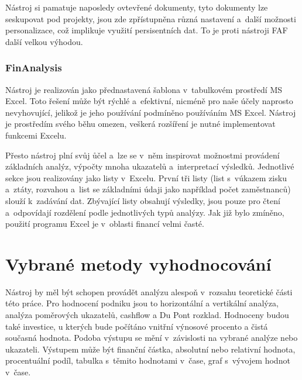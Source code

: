 Nástroj si pamatuje naposledy ovtevřené dokumenty, tyto dokumenty lze seskupovat pod projekty, jsou zde zpřístupněna různá nastavení a~další možnosti personalizace, což implikuje využití persisentních dat. To je proti nástroji FAF další velkou výhodou. 


\subsubsection{FinAnalysis}
Nástroj je realizován jako přednastavená šablona v~tabulkovém prostředí MS Excel. Toto řešení může být rýchlé a~efektivní, nicméně pro naše účely naprosto nevyhovující, jelikož je jeho používání podmíněno používáním MS Excel. Nástroj je prostředím svého běhu omezen, veškerá rozšíření je nutné implementovat funkcemi Excelu.

Přesto nástroj plní svůj ůčel a~lze se v~něm inspirovat možnostmi provádení základních analýz, výpočty mnoha ukazatelů a~interpretací výsledků. Jednotlivé sekce jsou realizovány jako listy v~Excelu. První tři listy (list s~vúkazem zisku a~ztáty, rozvahou a~list se základními údaji jako například počet zaměstnanců) slouží k~zadávání dat. Zbývající listy obsahují výsledky, jsou pouze pro čtení a~odpovídají rozdělení podle jednotlivých typů analýzy. Jak již bylo zmíněno, použití programu Excel je v~oblasti financí velmi časté.



\section{Vybrané metody vyhodnocování}
Nástroj by měl být schopen provádět analýzu alespoň v~rozsahu teoretické části této práce. Pro hodnocení podniku jsou to horizontální a vertikální analýza, analýza poměrových ukazatelů, cashflow a Du Pont rozklad. Hodnoceny budou také investice, u kterých bude počítáno vnitřní výnosové procento a čistá současná hodnota. Podoba výstupu se mění v~závislosti na vybrané analýze nebo ukazateli. Výstupem může být finanční částka, absolutní nebo relativní hodnota, procentuální podíl, tabulka s~těmito hodnotami v~čase, graf s~vývojem hodnot v~čase.

